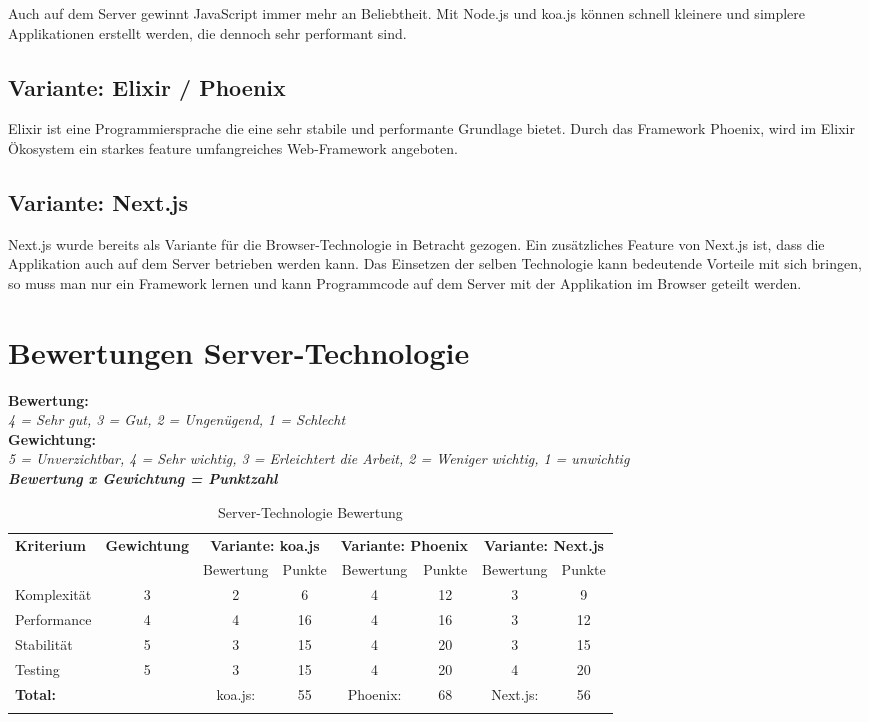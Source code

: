 Auch auf dem Server gewinnt JavaScript immer mehr an Beliebtheit.
Mit Node.js und koa.js können schnell kleinere und simplere Applikationen
erstellt werden, die dennoch sehr performant sind.

\subsection{Variante: Elixir / Phoenix}

Elixir ist eine Programmiersprache die eine sehr stabile und performante Grundlage
bietet. Durch das Framework Phoenix, wird im Elixir Ökosystem ein starkes feature
umfangreiches Web-Framework angeboten.

\subsection{Variante: Next.js}

Next.js wurde bereits als Variante für die Browser-Technologie in Betracht
gezogen. Ein zusätzliches Feature von Next.js ist, dass die Applikation auch
auf dem Server betrieben werden kann.
Das Einsetzen der selben Technologie kann bedeutende Vorteile mit sich bringen,
so muss man nur ein Framework lernen und kann Programmcode auf dem Server mit
der Applikation im Browser geteilt werden.

\clearpage
\section{Bewertungen Server-Technologie}\label{bewertungen-server-technologie}

\textbf{Bewertung:}\\
\textit{4 = Sehr gut, 3 = Gut, 2 = Ungenügend, 1 = Schlecht}\\
\textbf{Gewichtung:}\\
\textit{5 = Unverzichtbar, 4 = Sehr wichtig, 3 = Erleichtert die Arbeit, 2 = Weniger wichtig, 1 = unwichtig}\\

\textbf{\textit{Bewertung x Gewichtung = Punktzahl}}

\begin{longtable}[]{@{}p{2cm}ccccccc@{}}
  \toprule
  \textbf{Kriterium} & \textbf{Gewichtung} & \multicolumn{2}{c}{\textbf{Variante: koa.js}} & \multicolumn{2}{c}{\textbf{Variante: Phoenix}} & \multicolumn{2}{c}{\textbf{Variante: Next.js}}\tabularnewline
  & & Bewertung & Punkte & Bewertung & Punkte & Bewertung & Punkte \tabularnewline
  \midrule
  \endhead
  Komplexität & 3 & 2 & 6 & 4 & 12 & 3 & 9 \tabularnewline
  Performance & 4 & 4 & 16 & 4 & 16 & 3 & 12 \tabularnewline
  Stabilität & 5 & 3 & 15 & 4 & 20 & 3 & 15 \tabularnewline
  Testing & 5 & 3 & 15 & 4 & 20 & 4 & 20 \tabularnewline
  \midrule
  \textbf{Total:} & & koa.js: & 55 & Phoenix: & 68 & Next.js: & 56 \tabularnewline
  \bottomrule
  \caption{Server-Technologie Bewertung}
\end{longtable}

